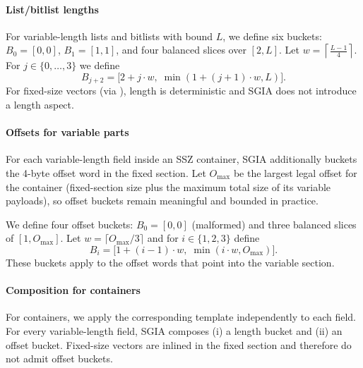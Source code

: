 \paragraph{List/bitlist lengths}
For variable-length lists  and bitlists  with bound $L$, we define six buckets: $B_0=[0,0]$, $B_1=[1,1]$, and four balanced slices over $[2,L]$.
Let $w = \left\lceil \frac{L-1}{4} \right\rceil$.
For $j\in\{0,\ldots,3\}$ we define
\[
  B_{j+2} = \big[2 + j\cdot w,\; \min(1 + (j+1)\cdot w, L)\big].
\]
For fixed-size vectors (via ), length is deterministic and SGIA does not introduce a length aspect.

\paragraph{Offsets for variable parts}
For each variable-length field inside an SSZ container, SGIA additionally buckets the 4-byte offset word in the fixed section.
Let $O_{\max}$ be the largest legal offset for the container (fixed-section size plus the maximum total size of its variable payloads), so offset buckets remain meaningful and bounded in practice.

We define four offset buckets: $B_0=[0,0]$ (malformed) and three balanced slices of $[1,O_{\max}]$.
Let $w = \lceil O_{\max}/3\rceil$ and for $i\in\{1,2,3\}$ define
\[
  B_i = \big[1+(i-1)\cdot w,\; \min(i\cdot w, O_{\max})\big].
\]
These buckets apply to the offset words that point into the variable section.

\paragraph{Composition for containers}
For containers, we apply the corresponding template independently to each field.
For every variable-length field, SGIA composes (i) a length bucket and (ii) an offset bucket.
Fixed-size vectors are inlined in the fixed section and therefore do not admit offset buckets.
